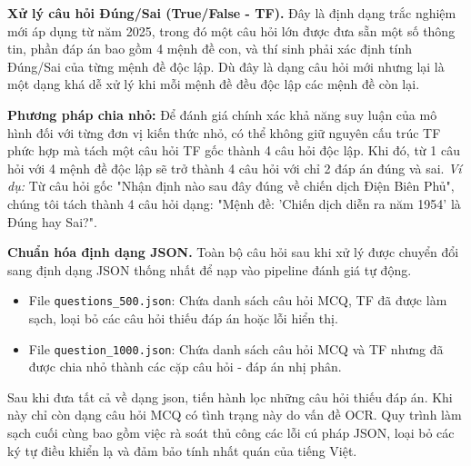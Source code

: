 \textbf{Xử lý câu hỏi Đúng/Sai (True/False - TF).}
Đây là định dạng trắc nghiệm mới áp dụng từ năm 2025, trong đó một câu hỏi lớn được đưa sẵn một số thông tin, phần đáp án bao gồm 4 mệnh đề con, và thí sinh phải xác định tính Đúng/Sai của từng mệnh đề độc lập. Dù đây là dạng câu hỏi mới nhưng lại là một dạng khá dễ xử lý khi mỗi mệnh đề đều độc lập các mệnh đề còn lại.

\textbf{Phương pháp chia nhỏ:}
Để đánh giá chính xác khả năng suy luận của mô hình đối với từng đơn vị kiến thức nhỏ, có thể không giữ nguyên cấu trúc TF phức hợp mà tách một câu hỏi TF gốc thành 4 câu hỏi độc lập. Khi đó, từ 1 câu hỏi với 4 mệnh đề độc lập sẽ trở thành 4 câu hỏi với chỉ 2 đáp án đúng và sai.
\textit{Ví dụ:} Từ câu hỏi gốc "Nhận định nào sau đây đúng về chiến dịch Điện Biên Phủ", chúng tôi tách thành 4 câu hỏi dạng: "Mệnh đề: 'Chiến dịch diễn ra năm 1954' là Đúng hay Sai?".

\textbf{Chuẩn hóa định dạng JSON.}
Toàn bộ câu hỏi sau khi xử lý được chuyển đổi sang định dạng JSON thống nhất để nạp vào pipeline đánh giá tự động.
\begin{itemize}
    \item File \texttt{questions\_500.json}: Chứa danh sách câu hỏi MCQ, TF đã được làm sạch, loại bỏ các câu hỏi thiếu đáp án hoặc lỗi hiển thị.
    \item File \texttt{question\_1000.json}: Chứa danh sách câu hỏi MCQ và TF nhưng đã được chia nhỏ thành các cặp câu hỏi - đáp án nhị phân.
\end{itemize}
Sau khi đưa tất cả về dạng json, tiến hành lọc những câu hỏi thiếu đáp án. Khi này chỉ còn dạng câu hỏi MCQ có tình trạng này do vấn đề OCR. Quy trình làm sạch cuối cùng bao gồm việc rà soát thủ công các lỗi cú pháp JSON, loại bỏ các ký tự điều khiển lạ và đảm bảo tính nhất quán của tiếng Việt.